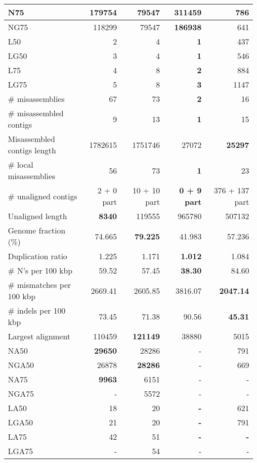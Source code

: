 \documentclass[12pt,a4paper]{article}
\begin{document}
\begin{table}[ht]
\begin{center}
\begin{tabular}{|l*{4}{|r}|}
N75 & 179754 & 79547 & {\bf 311459} & 786 \\ \hline
NG75 & 118299 & 79547 & {\bf 186938} & 641 \\ \hline
L50 & 2 & 4 & {\bf 1} & 437 \\ \hline
LG50 & 3 & 4 & {\bf 1} & 546 \\ \hline
L75 & 4 & 8 & {\bf 2} & 884 \\ \hline
LG75 & 5 & 8 & {\bf 3} & 1147 \\ \hline
\# misassemblies & 67 & 73 & {\bf 2} & 16 \\ \hline
\# misassembled contigs & 9 & 13 & {\bf 1} & 15 \\ \hline
Misassembled contigs length & 1782615 & 1751746 & 27072 & {\bf 25297} \\ \hline
\# local misassemblies & 56 & 73 & {\bf 1} & 23 \\ \hline
\# unaligned contigs & 2 + 0 part & 10 + 10 part & {\bf 0 + 9 part} & 376 + 137 part \\ \hline
Unaligned length & {\bf 8340} & 119555 & 965780 & 507132 \\ \hline
Genome fraction (\%) & 74.665 & {\bf 79.225} & 41.983 & 57.236 \\ \hline
Duplication ratio & 1.225 & 1.171 & {\bf 1.012} & 1.084 \\ \hline
\# N's per 100 kbp & 59.52 & 57.45 & {\bf 38.30} & 84.60 \\ \hline
\# mismatches per 100 kbp & 2669.41 & 2605.85 & 3816.07 & {\bf 2047.14} \\ \hline
\# indels per 100 kbp & 73.45 & 71.38 & 90.56 & {\bf 45.31} \\ \hline
Largest alignment & 110459 & {\bf 121149} & 38880 & 5015 \\ \hline
NA50 & {\bf 29650} & 28286 & - & 791 \\ \hline
NGA50 & 26878 & {\bf 28286} & - & 669 \\ \hline
NA75 & {\bf 9963} & 6151 & - & - \\ \hline
NGA75 & - & 5572 & - & - \\ \hline
LA50 & 18 & 20 & {\bf -} & 621 \\ \hline
LGA50 & 21 & 20 & {\bf -} & 791 \\ \hline
LA75 & 42 & 51 & {\bf -} & {\bf -} \\ \hline
LGA75 & - & 54 & - & - \\ \hline
\end{tabular}
\end{center}
\end{table}
\end{document}
